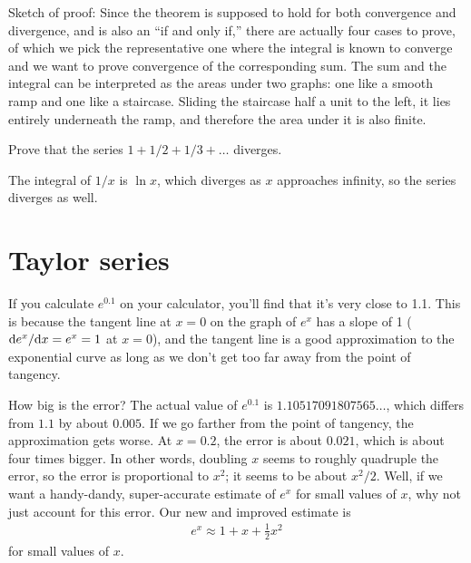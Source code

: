 Sketch of proof: Since the theorem is supposed to hold for both convergence and divergence, and is also an ``if and only if,''
there are actually four cases to prove, of which we pick the representative one where the integral is known to converge and we
want to prove convergence of the corresponding sum.
The sum and the integral can be interpreted as the areas under two graphs: one like a smooth ramp and one like a staircase.
Sliding the staircase half a unit to the left, it lies entirely underneath the ramp, and therefore the area under it is
also finite.

\begin{eg}
\egquestion Prove that the series $1+1/2+1/3+\ldots$ diverges.

\eganswer The integral of $1/x$ is $\ln x$, which diverges as $x$ approaches infinity, so the series diverges as well.
\end{eg}


\section{Taylor series}\label{sec:taylor}

If you calculate $e^{0.1}$ on your calculator, you'll find that
it's very close to 1.1. This is because the tangent line at $x=0$
on the graph of $e^x$ has a slope of 1 ($\textup{d} e^x/\textup{d} x=e^x=1$ at $x=0$),
and the tangent line is a good approximation to the exponential curve
as long as we don't get too far away from the point of tangency.


How big is the error? The actual value of $e^{0.1}$ is $1.10517091807565\ldots$, which
differs from $1.1$ by about $0.005$. If we go farther from the point of tangency,
the approximation gets worse. At $x=0.2$, the error is about $0.021$, which is about
four times bigger. In other words, doubling $x$ seems to roughly quadruple the error,
so the error is proportional to $x^2$; it seems to be about $x^2/2$. Well, if we want a handy-dandy, super-accurate
estimate of $e^x$ for small values of $x$, why not just account for this
error. Our new and improved estimate is
\begin{align*}
  e^x \approx 1+x+\frac{1}{2}x^2
\end{align*}
for small values of $x$.


